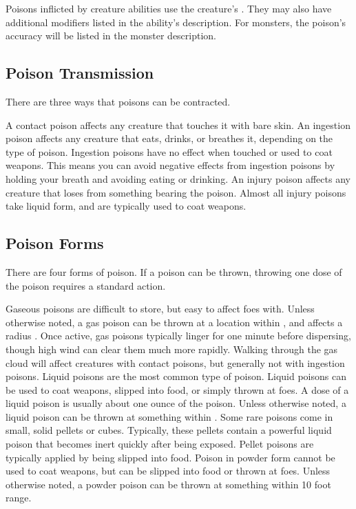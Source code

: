       Poisons inflicted by creature abilities use the creature's .
      They may also have additional modifiers listed in the ability's description.
      For monsters, the poison's accuracy will be listed in the monster description.

  \subsection{Poison Transmission}\label{Poison Transmission}\label{Transmission}

    There are three ways that poisons can be contracted.

     A contact poison affects any creature that touches it with bare skin.
     An ingestion poison affects any creature that eats, drinks, or breathes it, depending on the type of poison.
    Ingestion poisons have no effect when touched or used to coat weapons.
    This means you can avoid negative effects from ingestion poisons by holding your breath and avoiding eating or drinking.
     An injury poison affects any creature that loses  from something bearing the poison.
    Almost all injury poisons take liquid form, and are typically used to coat weapons.

  \subsection{Poison Forms}\label{Poison Forms}

    There are four forms of poison.
    If a poison can be thrown, throwing one dose of the poison requires a standard action.

     Gaseous poisons are difficult to store, but easy to affect foes with.
    Unless otherwise noted, a gas poison can be thrown at a location within \shortrange, and affects a \tinyarea radius .
    Once active, gas poisons typically linger for one minute before dispersing, though high wind can clear them much more rapidly.
    Walking through the gas cloud will affect creatures with contact poisons, but generally not with ingestion poisons.
     Liquid poisons are the most common type of poison.
    Liquid poisons can be used to coat weapons, slipped into food, or simply thrown at foes.
    A dose of a liquid poison is usually about one ounce of the poison.
    Unless otherwise noted, a liquid poison can be thrown at something within \shortrange.
     Some rare poisons come in small, solid pellets or cubes.
    Typically, these pellets contain a powerful liquid poison that becomes inert quickly after being exposed.
    Pellet poisons are typically applied by being slipped into food.
     Poison in powder form cannot be used to coat weapons, but can be slipped into food or thrown at foes.
    Unless otherwise noted, a powder poison can be thrown at something within 10 foot range.

